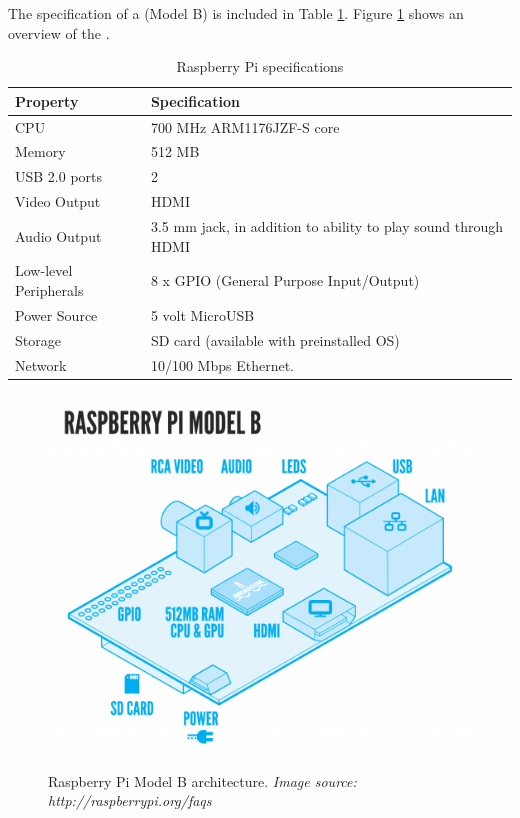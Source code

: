 The specification of a \rpi{} (Model B) is included in Table \ref{tab:pi-specs}. Figure \ref{fig:pi-arch-overview} shows an overview of the \rpi{}.        

\begin{table}[H]
\begin{tabular}{|p{6.0cm} | p{6.0cm} |}
\hline 
\textbf{Property} & \textbf{Specification} \\
\hline
CPU & 700 MHz ARM1176JZF-S core \\
\hline
Memory & 512 MB \\
\hline
USB 2.0 ports & 2 \\
\hline
Video Output & HDMI \\
\hline
Audio Output & 3.5 mm jack, in addition to ability to play sound through HDMI \\
\hline
Low-level Peripherals & 8 x GPIO (General Purpose Input/Output) \\
\hline
Power Source & 5 volt MicroUSB \\
\hline
Storage & SD card (available with preinstalled OS) \\
\hline
Network & 10/100 Mbps Ethernet.  \\
\hline
\end{tabular}
\caption{Raspberry Pi specifications}
\label{tab:pi-specs}
\end{table}

\begin{figure}[H] 
	\centering
		\includegraphics[width=0.3\paperwidth]{Pictures/rpi-arch-overview.png}
	\caption{Raspberry Pi Model B architecture. \emph{Image source: http://raspberrypi.org/faqs} }
	\label{fig:pi-arch-overview}
\end{figure}
 
